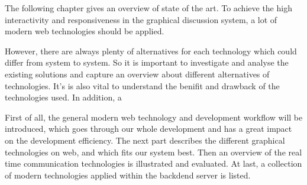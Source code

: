 The following chapter gives an overview of state of the art. To achieve the high interactivity and responsiveness in the graphical discussion system, a lot of modern web technologies should be applied.

However, there are always plenty of alternatives for each technology which could differ from system to system. So it is important to investigate and analyse the existing solutions and capture an overview about different alternatives of technologies. It's is also vital to understand the benifit and drawback of the technologies used. In addition, a

First of all, the general modern web technology and development workflow will be introduced, which goes through our whole development and has a great impact on the development efficiency. The next part describes the different graphical technologies on web, and which fits our system best. Then an overview of the real time communication technologies is illustrated and evaluated. At last, a collection of modern technologies applied within the backdend server is listed.
